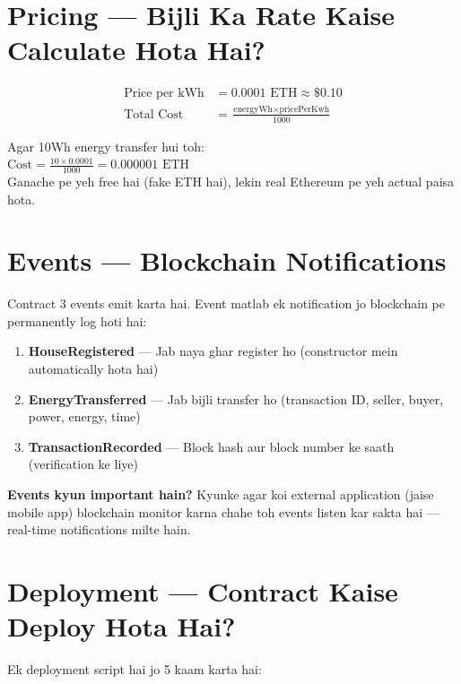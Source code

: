 \section{Pricing --- Bijli Ka Rate Kaise Calculate Hota Hai?}

\begin{align*}
\text{Price per kWh} &= 0.0001 \text{ ETH} \approx \$0.10 \\
\text{Total Cost} &= \frac{\text{energyWh} \times \text{pricePerKwh}}{1000}
\end{align*}

\begin{tipbox}[Example]
Agar 10Wh energy transfer hui toh:\\
$\text{Cost} = \frac{10 \times 0.0001}{1000} = 0.000001 \text{ ETH}$\\[0.2cm]
Ganache pe yeh free hai (fake ETH hai), lekin real Ethereum pe yeh actual paisa hota.
\end{tipbox}

\section{Events --- Blockchain Notifications}

Contract 3 events emit karta hai. Event matlab ek notification jo blockchain pe permanently log hoti hai:

\begin{enumerate}[nosep]
    \item \textbf{HouseRegistered} --- Jab naya ghar register ho (constructor mein automatically hota hai)
    \item \textbf{EnergyTransferred} --- Jab bijli transfer ho (transaction ID, seller, buyer, power, energy, time)
    \item \textbf{TransactionRecorded} --- Block hash aur block number ke saath (verification ke liye)
\end{enumerate}

\textbf{Events kyun important hain?} Kyunke agar koi external application (jaise mobile app) blockchain monitor karna chahe toh events listen kar sakta hai --- real-time notifications milte hain.

\section{Deployment --- Contract Kaise Deploy Hota Hai?}

Ek deployment script hai jo 5 kaam karta hai:

